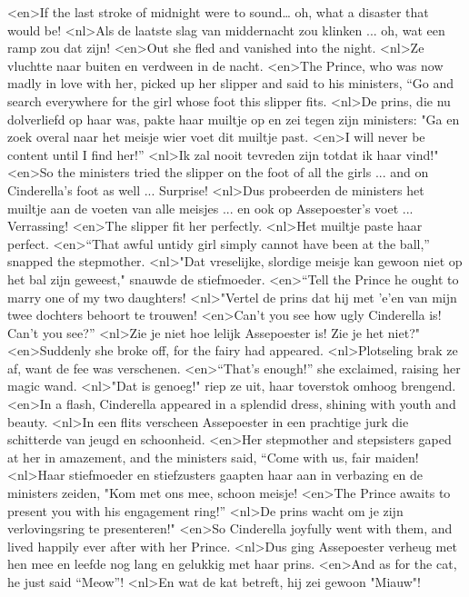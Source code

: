 <en>If the last stroke of midnight were to sound… oh, what a disaster that would be!
<nl>Als de laatste slag van middernacht zou klinken ... oh, wat een ramp zou dat zijn!
<en>Out she fled and vanished into the night.
<nl>Ze vluchtte naar buiten en verdween in de nacht.
<en>The Prince, who was now madly in love with her, picked up her slipper and said to his ministers, “Go and search everywhere for the girl whose foot this slipper fits.
<nl>De prins, die nu dolverliefd op haar was, pakte haar muiltje op en zei tegen zijn ministers: "Ga en zoek overal naar het meisje wier voet dit muiltje past.
<en>I will never be content until I find her!” 
<nl>Ik zal nooit tevreden zijn totdat ik haar vind!"
<en>So the ministers tried the slipper on the foot of all the girls ... and on Cinderella’s foot as well ... Surprise!
<nl>Dus probeerden de ministers het muiltje  aan de voeten van alle meisjes ... en ook op Assepoester's voet ... Verrassing!
<en>The slipper fit her perfectly.
<nl>Het muiltje paste haar perfect.
<en>“That awful untidy girl simply cannot have been at the ball,” snapped the stepmother.
<nl>"Dat vreselijke, slordige meisje kan gewoon niet op het bal zijn geweest," snauwde de stiefmoeder.
<en>“Tell the Prince he ought to marry one of my two daughters!
<nl>"Vertel de prins dat hij met 'e'en van mijn twee dochters behoort te trouwen!
<en>Can’t you see how ugly Cinderella is! Can’t you see?”
<nl>Zie je niet hoe lelijk Assepoester is! Zie je het niet?"
<en>Suddenly she broke off, for the fairy had appeared.
<nl>Plotseling brak ze af, want de fee was verschenen.
<en>“That’s enough!” she exclaimed, raising her magic wand.
<nl>"Dat is genoeg!" riep ze uit, haar toverstok omhoog brengend.
<en>In a flash, Cinderella appeared in a splendid dress, shining with youth and beauty.
<nl>In een flits verscheen Assepoester in een prachtige jurk die schitterde van jeugd en schoonheid.
<en>Her stepmother and stepsisters gaped at her in amazement, and the ministers said, “Come with us, fair maiden!
<nl>Haar stiefmoeder en stiefzusters gaapten  haar aan in verbazing en de ministers zeiden, "Kom met ons mee, schoon meisje!
<en>The Prince awaits to present you with his engagement ring!” 
<nl>De prins wacht om je zijn verlovingsring te presenteren!"
<en>So Cinderella joyfully went with them, and lived happily ever after with her Prince.
<nl>Dus ging Assepoester verheug met hen mee en leefde nog lang en gelukkig met haar prins.
<en>And as for the cat, he just said “Meow”!
<nl>En wat de kat betreft, hij zei gewoon "Miauw"!
